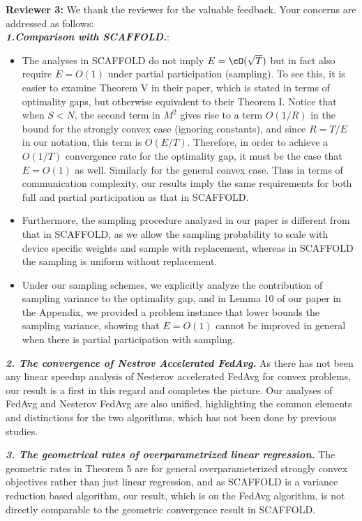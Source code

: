 {\color{blue}\textbf{Reviewer 3:}} We thank the reviewer for the valuable feedback. Your concerns are addressed as follows: \\
\textbf{\textit{1.Comparison with SCAFFOLD.}}: 
\begin{itemize}
	\item The analyses in SCAFFOLD do not imply $E=\cO(\sqrt{T})$ but in fact also require $E=O(1)$ under partial participation (sampling). To see this, it is easier to examine Theorem V in their paper, which is stated in terms of optimality gaps, but otherwise equivalent to their Theorem I. Notice that when $S<N$, the second term in $M^2$ gives rise to a term $O(1/R)$ in the bound for the strongly convex case (ignoring constants), and since $R=T/E$ in our notation, this term is $O(E/T)$. Therefore, in order to achieve a $O(1/T)$ convergence rate for the optimality gap, it must be the case that $E=O(1)$ as well. Similarly for the general convex case. Thus in terms of communication complexity, our results imply the same requirements for both full and partial participation as that in SCAFFOLD. 
	\item Furthermore, the sampling procedure analyzed in our paper is different from that in SCAFFOLD, as we allow the sampling probability to scale with device specific weights and sample with replacement, whereas in SCAFFOLD the sampling is uniform without replacement. 
	\item  Under our sampling schemes, we explicitly analyze the contribution of sampling variance to the optimality gap, and in Lemma 10 of our paper in the Appendix, we provided a problem instance that lower bounds the sampling variance, showing that $E=O(1)$ cannot be improved in general when there is partial participation with sampling.
\end{itemize}

\textbf{\textit{2. The convergence of Nestrov Accelerated FedAvg.}}
As there has not been any linear speedup analysis of Nesterov accelerated FedAvg for convex problems, our result is a first in this regard and completes the picture. Our analyses of FedAvg and Nesterov FedAvg are also unified, highlighting the common elements and distinctions for the two algorithms, which has not been done by previous studies. 

\textbf{\textit{3. The geometrical rates of overparametrized linear regression.}}
The geometric rates in Theorem 5 are for general overparameterized strongly convex objectives rather than just linear regression, and as SCAFFOLD is a variance reduction based algorithm, our result, which is on the FedAvg algorithm, is not directly comparable to the geometric convergence result in SCAFFOLD.